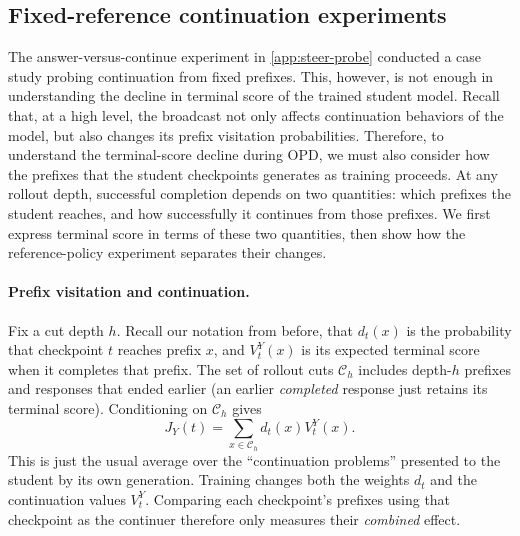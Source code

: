 %

\newpage
\subsection{Fixed-reference continuation experiments}
\label{app:continuation-profile}
\label{app:fixed-reference-continuations}

The answer-versus-continue experiment in \cref{app:steer-probe} conducted a case study probing continuation from fixed prefixes. This, however, is not enough in understanding the decline in terminal score of the trained student model. Recall that, at a high level, the broadcast not only affects continuation behaviors of the model, but also changes its prefix visitation probabilities. Therefore, to understand the terminal-score decline during OPD, we must also consider how the prefixes that the student checkpoints generates as training proceeds. At any rollout depth, successful completion depends on two quantities: which prefixes the student reaches, and how successfully it continues from those prefixes. We first express terminal score in terms of these two quantities, then show how the reference-policy experiment separates their changes.

\paragraph{Prefix visitation and continuation.}
Fix a cut depth $h$. Recall our notation from before, that $d_t(x)$ is the probability that checkpoint $t$ reaches prefix $x$, and $V_t^Y(x)$ is its expected terminal score when it completes that prefix. The set of rollout cuts $\mathcal C_h$ includes depth-$h$ prefixes and responses that ended earlier (an earlier \emph{completed} response just retains its terminal score). Conditioning on $\mathcal C_h$ gives
\[
 J_Y(t)=\sum_{x\in\mathcal C_h}d_t(x)V_t^Y(x).
\]
This is just the usual average over the ``continuation problems'' presented to the student by its own generation. Training changes both the weights $d_t$ and the continuation values $V_t^Y$. Comparing each checkpoint's prefixes using that checkpoint as the continuer therefore only measures their \emph{combined} effect.

